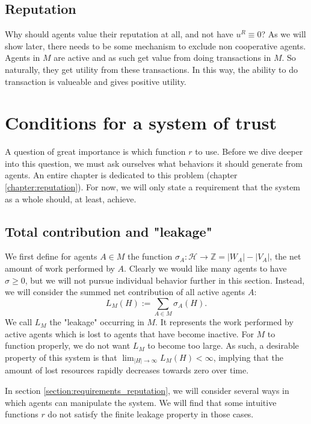 \subsection{Reputation}
Why should agents value their reputation at all, 
and not have $u^R \equiv 0$? 
As we will show later, 
there needs to be some mechanism to exclude non cooperative agents. 
Agents in $M$ are active and as such get value from doing transactions in $M$. 
So naturally, they get utility from these transactions. 
In this way, the ability to do transaction is valueable and gives positive utility.

\section{Conditions for a system of trust}
A question of great importance is which function $r$ to use. 
Before we dive deeper into this question, 
we must ask ourselves what behaviors it should generate from agents. 
An entire chapter is dedicated to this problem (chapter \ref{chapter:reputation}). 
For now, we will only state a requirement that the system as a whole should, at least, achieve.

\subsection{Total contribution and "leakage"}
We first define for agents $A \in M$ the function $\sigma_A: \mathcal{H} \to \mathds{Z} = |W_A| - |V_A|$, the net amount of work performed by $A$. 
Clearly we would like many agents to have $\sigma \geq 0$, 
but we will not pursue individual behavior further in this section. 
Instead, we will consider the summed net contribution of all active agents $A$:
\[L_M(H) := \sum_{A \in M} \sigma_A(H).\]
We call $L_M$ the "leakage" occurring in $M$. 
It represents the work performed by active agents which is lost to agents that have become inactive. 
For $M$ to function properly, 
we do not want $L_M$ to become too large. 
As such, a desirable property of this system is that $\lim_{|H| \to \infty} L_M(H) < \infty$, 
implying that the amount of lost resources rapidly decreases towards zero over time. 

In section \ref{section:requirements_reputation}, we will consider several ways in which agents can manipulate the system. 
We will find that some intuitive functions $r$ do not satisfy the finite leakage property in those cases.

